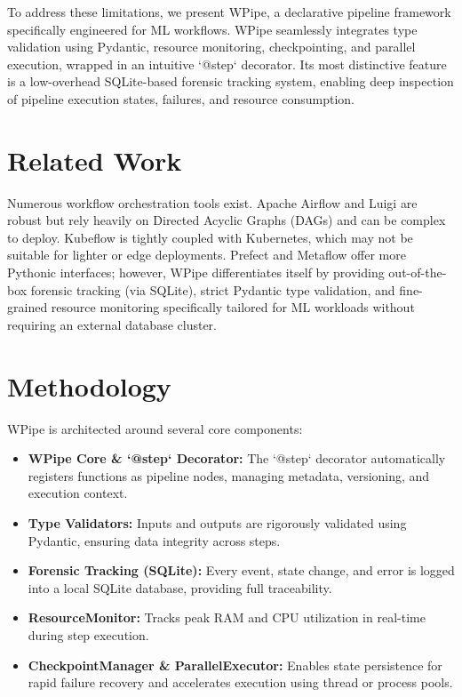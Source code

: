 \documentclass[conference]{IEEEtran}
\begin{document}
To address these limitations, we present WPipe, a declarative pipeline framework specifically engineered for ML workflows. WPipe seamlessly integrates type validation using Pydantic, resource monitoring, checkpointing, and parallel execution, wrapped in an intuitive `@step` decorator. Its most distinctive feature is a low-overhead SQLite-based forensic tracking system, enabling deep inspection of pipeline execution states, failures, and resource consumption.

\section{Related Work}
Numerous workflow orchestration tools exist. Apache Airflow \cite{airflow} and Luigi \cite{luigi} are robust but rely heavily on Directed Acyclic Graphs (DAGs) and can be complex to deploy. Kubeflow \cite{kubeflow} is tightly coupled with Kubernetes, which may not be suitable for lighter or edge deployments. Prefect \cite{prefect} and Metaflow \cite{metaflow} offer more Pythonic interfaces; however, WPipe differentiates itself by providing out-of-the-box forensic tracking (via SQLite), strict Pydantic type validation, and fine-grained resource monitoring specifically tailored for ML workloads without requiring an external database cluster.

\section{Methodology}
WPipe is architected around several core components:
\begin{itemize}
    \item \textbf{WPipe Core \& `@step` Decorator:} The `@step` decorator automatically registers functions as pipeline nodes, managing metadata, versioning, and execution context.
    \item \textbf{Type Validators:} Inputs and outputs are rigorously validated using Pydantic, ensuring data integrity across steps.
    \item \textbf{Forensic Tracking (SQLite):} Every event, state change, and error is logged into a local SQLite database, providing full traceability.
    \item \textbf{ResourceMonitor:} Tracks peak RAM and CPU utilization in real-time during step execution.
    \item \textbf{CheckpointManager \& ParallelExecutor:} Enables state persistence for rapid failure recovery and accelerates execution using thread or process pools.
\end{itemize}
\end{document}
